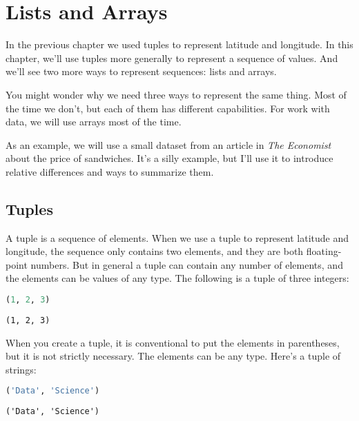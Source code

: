 \hypertarget{lists-and-arrays}{%
\chapter{Lists and Arrays}\label{lists-and-arrays}}

In the previous chapter we used tuples to represent latitude and
longitude. In this chapter, we'll use tuples more generally to represent
a sequence of values. And we'll see two more ways to represent
sequences: lists and arrays.

You might wonder why we need three ways to represent the same thing.
Most of the time we don't, but each of them has different capabilities.
For work with data, we will use arrays most of the time.

As an example, we will use a small dataset from an article in \emph{The
Economist} about the price of sandwiches. It's a silly example, but I'll
use it to introduce relative differences and ways to summarize them.

\hypertarget{tuples}{%
\section{Tuples}\label{tuples}}

A tuple is a sequence of elements. When we use a tuple to represent
latitude and longitude, the sequence only contains two elements, and
they are both floating-point numbers. But in general a tuple can contain
any number of elements, and the elements can be values of any type. The
following is a tuple of three integers:

\begin{lstlisting}[language=Python,style=source]
(1, 2, 3)
\end{lstlisting}

\begin{lstlisting}[style=output]
(1, 2, 3)
\end{lstlisting}

When you create a tuple, it is conventional to put the elements in
parentheses, but it is not strictly necessary. The elements can be any
type. Here's a tuple of strings:

\begin{lstlisting}[language=Python,style=source]
('Data', 'Science')
\end{lstlisting}

\begin{lstlisting}[style=output]
('Data', 'Science')
\end{lstlisting}

